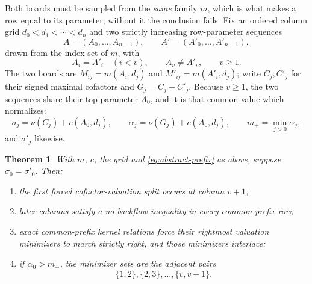 \documentclass[11pt,a4paper]{amsart}
\numberwithin{equation}{section}
\theoremstyle{plain}
\newtheorem{theorem}{Theorem}[section]
\theoremstyle{definition}
\begin{document}
Both boards must be sampled from the \emph{same} family \(m\), which is what
makes a row equal to its parameter; without it the conclusion fails.  Fix an ordered column grid \(d_0<d_1<\cdots<d_n\) and two strictly increasing row-parameter sequences
\[
A=(A_0,\ldots,A_{n-1}),
\qquad
A'=(A'_0,\ldots,A'_{n-1}),
\]
drawn from the index set of \(m\), with
\begin{equation}\label{eq:abstract-prefix}
A_i=A'_i\quad(i<v),
\qquad
A_v\ne A'_v,
\qquad
v\ge1 .
\end{equation}
The two boards are \(M_{ij}=m(A_i,d_j)\) and \(M'_{ij}=m(A'_i,d_j)\); write
\(C_j,C'_j\) for their signed maximal cofactors and \(G_j=C_j-C'_j\).  Because
\(v\ge1\), the two sequences share their top parameter \(A_0\), and it is that
common value which normalizes:
\begin{equation}\label{eq:abstract-normalization}
\sigma_j=\nu(C_j)+c(A_0,d_j),
\qquad
\alpha_j=\nu(G_j)+c(A_0,d_j),
\qquad
m_+=\min_{j>0}\alpha_j,
\end{equation}
and \(\sigma'_j\) likewise.

\begin{theorem}\label{thm:abstract-monge}
With \(m\), \(c\), the grid and \eqref{eq:abstract-prefix} as above, suppose
\(\sigma_0=\sigma'_0\).  Then:
\begin{enumerate}[label=(\roman*),leftmargin=2em]
\item the first forced cofactor-valuation split occurs at column \(v+1\);
\item later columns satisfy a no-backflow inequality in every common-prefix row;
\item exact common-prefix kernel relations force their rightmost valuation minimizers to march strictly right, and those minimizers interlace;
\item if \(\alpha_0>m_+\), the minimizer sets are the adjacent pairs
\[
\{1,2\},\{2,3\},\ldots,\{v,v+1\}.
\]
\end{enumerate}
\end{theorem}
\end{document}
